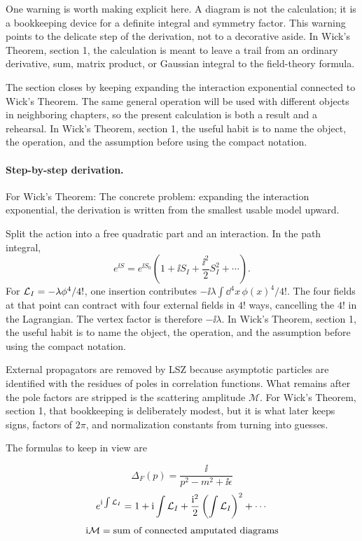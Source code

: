 One warning is worth making explicit here.  A diagram is not the calculation; it is a bookkeeping device for a definite integral and symmetry factor.  This warning points to the delicate step of the derivation, not to a decorative aside.  In Wick's Theorem, section 1, the calculation is meant to leave a trail from an ordinary derivative, sum, matrix product, or Gaussian integral to the field-theory formula.

The section closes by keeping expanding the interaction exponential connected to Wick's Theorem.  The same general operation will be used with different objects in neighboring chapters, so the present calculation is both a result and a rehearsal.  In Wick's Theorem, section 1, the useful habit is to name the object, the operation, and the assumption before using the compact notation.



\paragraph{Step-by-step derivation.}

For Wick's Theorem: The concrete problem: expanding the interaction exponential, the derivation is written from the smallest usable model upward.

Split the action into a free quadratic part and an interaction.  In the path integral,
\[
  e^{\ii S}=e^{\ii S_0}\left(1+\ii S_I+\frac{\ii^2}{2}S_I^2+\cdots\right).
\]
For \(\mathcal L_I=-\lambda\phi^4/4!\), one insertion contributes \(-\ii\lambda\int\dd^4x\,\phi(x)^4/4!\).  The four fields at that point can contract with four external fields in \(4!\) ways, cancelling the \(4!\) in the Lagrangian.  The vertex factor is therefore \(-\ii\lambda\).  In Wick's Theorem, section 1, the useful habit is to name the object, the operation, and the assumption before using the compact notation.

External propagators are removed by LSZ because asymptotic particles are identified with the residues of poles in correlation functions.  What remains after the pole factors are stripped is the scattering amplitude \(\mathcal M\).  For Wick's Theorem, section 1, that bookkeeping is deliberately modest, but it is what later keeps signs, factors of \(2\pi\), and normalization constants from turning into guesses.

The formulas to keep in view are

\[
  \Delta_F(p)=\frac{\ii}{p^2-m^2+\ii\epsilon}
\]
\[
  e^{\mathrm i\int\mathcal L_I}=1+\mathrm i\int\mathcal L_I+\frac{\mathrm i^2}{2}\left(\int\mathcal L_I\right)^2+\cdots
\]
\[
  \mathrm i\mathcal M=\hbox{sum of connected amputated diagrams}
\]

